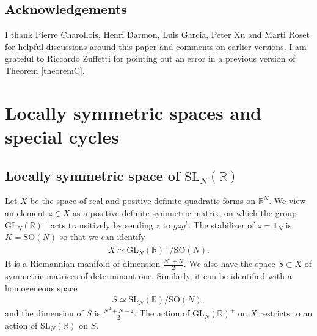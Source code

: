 \documentclass[a4paper,11pt]{amsart} %
\newcommand{\8}{\infty}
\newcommand{\id}{\mathbf{1}}
\newcommand{\SO}{\mathrm{SO}}
\newcommand{\SL}{\mathrm{SL}}
\newcommand{\GL}{\mathrm{GL}}
\newcommand{\R}{\mathbb{R}}
\theoremstyle{mytheoremstyle}
\theoremstyle{remark}
\numberwithin{equation}{section}
\begin{document}
%
\subsection{Acknowledgements}
I thank Pierre Charollois, Henri Darmon, Luis Garcia, Peter Xu and Marti Roset for helpful discussions around this paper and comments on earlier versions. I am grateful to Riccardo Zuffetti for pointing out an error in a previous version of Theorem \ref{theoremC}.

\section{Locally symmetric spaces and special cycles}\label{locally symmetric space}




\subsection{Locally symmetric space of $\SL_N(\R)$} Let $X$ be the space of real and positive-definite quadratic forms on $\R^N$. We view an element $z \in X$ as a positive definite symmetric matrix, on which the group $\GL_N(\R)^+$ acts transitively by sending $z$ to $gzg^t$. The stabilizer of $z=\id_N$ is $K=\SO(N)$ so that we can identify
\begin{align}
    X \simeq \GL_N(\R)^+/\SO(N).
\end{align} It is a Riemannian manifold of dimension $\frac{N^2+N}{2}$.
We also have the space $S \subset X$ of symmetric matrices of determinant one. Similarly, it can be identified with a homogeneous space
\begin{align}
    S \simeq \SL_N(\R)/\SO(N),
\end{align}
and the dimension of $S$ is $\frac{N^2+N-2}{2}$. The action of $\GL_N(\R)^+$ on $X$ restricts to an action of $\SL_N(\R)$ on $S$. 
\end{document}
